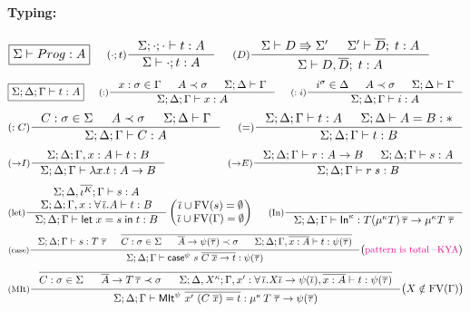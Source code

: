 \begin{figure}
\begin{framed}
\paragraph{Typing:}
\[ \fbox{$\Sigma |- Prog : A$}
 ~~~~
   \inference[($\cdot;t$)]{\Sigma;\cdot;\cdot |- t:A}
                          {\Sigma |- \cdot;t : A}
 ~~~~
   \inference[($D$)]{ \Sigma |- D \Rrightarrow \Sigma'
                    & \Sigma' |- \overline{D};\; t : A}
                    {\Sigma |- D,\overline{D};\; t : A}
\]
\[ \fbox{$\Sigma;\Delta;\Gamma |- t : A$}
 ~~~~
   \inference[($:$)]
      {x:\sigma \in \Gamma & A\prec\sigma & \Sigma;\Delta |- \Gamma} 
      {\Sigma;\Delta;\Gamma |- x:A}
 ~~~~
   \inference[($:i$)]
      {i^\sigma \in \Delta & A\prec\sigma & \Sigma;\Delta |- \Gamma} 
      {\Sigma;\Delta;\Gamma |- i:A}
\]
\[ \inference[($:C$)]
      {C:\sigma \in \Sigma & A\prec\sigma & \Sigma;\Delta |- \Gamma}
      {\Sigma;\Delta;\Gamma |- C:A}
 ~~~~
   \inference[($=$)]{\Sigma;\Delta;\Gamma |- t : A & \Sigma;\Delta |- A = B : *}
                    {\Sigma;\Delta;\Gamma |- t : B}
\]
\[ \inference[($->$$I$)]{\Sigma;\Delta;\Gamma,x:A |- t : B}
                        {\Sigma;\Delta;\Gamma |- \lambda x.t : A -> B}
 ~~~~ ~~~~ ~~~~ ~~~~
   \inference[($->$$E$)]{ \Sigma;\Delta;\Gamma |- r : A -> B
                        & \Sigma;\Delta;\Gamma |- s : A}
                        {\Sigma;\Delta;\Gamma |- r\;s : B}
\]
\[ \inference[(let)]
      { \Sigma;\Delta,\overline{\iota^K};\Gamma |- s : A \\
        \Sigma;\Delta;\Gamma,x:\forall\,\overline{\iota}.A |- t : B }
      {\Sigma;\Delta;\Gamma |- \Let{x}{s}{t} : B }
      \begin{pmatrix} \overline{\iota} \cup \FV(s) = \emptyset \\
                      \overline{\iota} \cup \FV(\Gamma) = \emptyset
      \end{pmatrix}
 ~~~~
   \inference[(In)]
      {}
      {\Sigma;\Delta;\Gamma |- \In^\kappa
        : T(\mu^\kappa T)\,\overline{\tau} -> \mu^\kappa T\; \overline{\tau} }
\]
\[ \inference[(case)]
      { \Sigma;\Delta;\Gamma |- s : T\;\overline\tau
      & \overline{\begin{matrix}
          C:\sigma \in \Sigma ~&~
          \overline{A} -> \psi(\overline{\tau}) \prec \sigma ~&~
          \Sigma;\Delta;\Gamma,\overline{x:A} |- t : \psi(\overline\tau) 
        \end{matrix} }
      }
      {\Sigma;\Delta;\Gamma |- \case^\psi~s~\overline{C\;\overline{x} -> t}
                             : \psi(\overline\tau) }
      \big( \text{\KYA{pattern is total}} \big)
\]
\[ \inference[(MIt)]
      { \overline{\begin{matrix}
        C:\sigma\in\Sigma ~&~ \overline{A} -> T\,\overline\tau \prec \sigma
      ~&~
        \Sigma;\Delta,X^{\kappa};
        \Gamma
            ,x':\forall\,\overline\iota.X\overline\iota -> \psi(\overline\iota)
            ,\overline{x:A}
          |- t : \psi(\overline\tau) \end{matrix} }
      }
      {\Sigma;\Delta;\Gamma
           |- \MIt^\psi ~ \overline{x' ~ (C\;\overline{x}) = t}
            : \mu^{\kappa}\,T\;\overline\tau -> \psi(\overline\tau) }
      \big( X\notin\FV(\Gamma) \big)
\]


\end{framed}
\end{figure}
